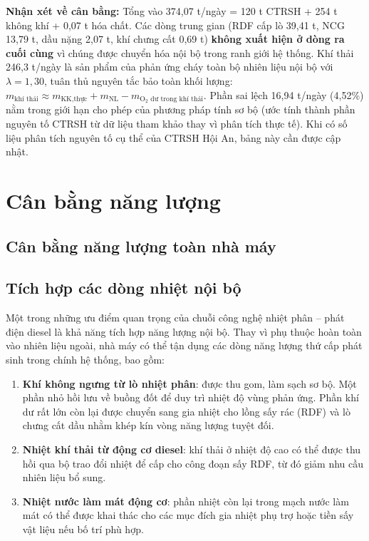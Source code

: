 \documentclass[../main.tex]{subfiles}
\begin{document}
\textbf{Nhận xét về cân bằng:} Tổng vào 374,07 t/ngày = 120 t CTRSH + 254 t không khí + 0,07 t hóa chất. Các dòng trung gian (RDF cấp lò 39,41 t, NCG 13,79 t, dầu nặng 2,07 t, khí chưng cất 0,69 t) \textbf{không xuất hiện ở dòng ra cuối cùng} vì chúng được chuyển hóa nội bộ trong ranh giới hệ thống. Khí thải 246,3 t/ngày là sản phẩm của phản ứng cháy toàn bộ nhiên liệu nội bộ với $\lambda = 1{,}30$, tuân thủ nguyên tắc bảo toàn khối lượng: $m_{\text{khí thải}} \approx m_{\text{KK,thực}} + m_{\text{NL}} - m_{\text{O}_2\text{ dư trong khí thải}}$. Phần sai lệch 16,94 t/ngày (4,52\%) nằm trong giới hạn cho phép của phương pháp tính sơ bộ (ước tính thành phần nguyên tố CTRSH từ dữ liệu tham khảo thay vì phân tích thực tế). Khi có số liệu phân tích nguyên tố cụ thể của CTRSH Hội An, bảng này cần được cập nhật.



\section{Cân bằng năng lượng}
\subsection{Cân bằng năng lượng toàn nhà máy}
\label{sec:can-bang-nang-luong}

\subsection{Tích hợp các dòng nhiệt nội bộ}

Một trong những ưu điểm quan trọng của chuỗi công nghệ nhiệt phân -- phát điện diesel là khả năng tích hợp năng lượng nội bộ. Thay vì phụ thuộc hoàn toàn vào nhiên liệu ngoài, nhà máy có thể tận dụng các dòng năng lượng thứ cấp phát sinh trong chính hệ thống, bao gồm:

\begin{enumerate}
  \item \textbf{Khí không ngưng từ lò nhiệt phân}: được thu gom, làm sạch sơ bộ. Một phần nhỏ hồi lưu về buồng đốt để duy trì nhiệt độ vùng phản ứng. Phần khí dư rất lớn còn lại được chuyển sang gia nhiệt cho lồng sấy rác (RDF) và lò chưng cất dầu nhằm khép kín vòng năng lượng tuyệt đối.
  \item \textbf{Nhiệt khí thải từ động cơ diesel}: khí thải ở nhiệt độ cao có thể được thu hồi qua bộ trao đổi nhiệt để cấp cho công đoạn sấy RDF, từ đó giảm nhu cầu nhiên liệu bổ sung.
  \item \textbf{Nhiệt nước làm mát động cơ}: phần nhiệt còn lại trong mạch nước làm mát có thể được khai thác cho các mục đích gia nhiệt phụ trợ hoặc tiền sấy vật liệu nếu bố trí phù hợp.
\end{enumerate}
\end{document}

